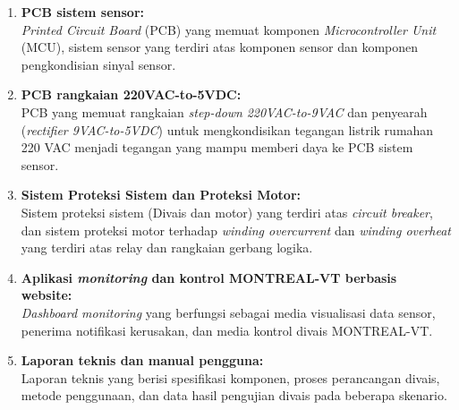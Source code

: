 \documentclass{elsinta}
\begin{document}
\begin{enumerate}
    \item   \textbf{PCB sistem sensor:} \\
            \textit{Printed Circuit Board} (PCB) yang memuat komponen
            \textit{Microcontroller Unit} (MCU), sistem sensor yang
            terdiri atas komponen sensor dan komponen pengkondisian sinyal
            sensor.
    \item   \textbf{PCB rangkaian 220VAC-to-5VDC:} \\ 
            PCB yang memuat rangkaian \textit{step-down} \textit{220VAC-to-9VAC} dan penyearah
            (\textit{rectifier 9VAC-to-5VDC}) untuk mengkondisikan
            tegangan listrik rumahan 220 VAC menjadi tegangan yang mampu
            memberi daya ke PCB sistem sensor.
    \item   \textbf{Sistem Proteksi Sistem dan Proteksi Motor:}\\
            Sistem proteksi sistem (Divais dan motor) yang terdiri atas
            \textit{circuit breaker}, dan sistem proteksi motor terhadap
            \textit{winding overcurrent} dan \textit{winding overheat} yang terdiri
            atas relay dan rangkaian gerbang logika.
    \item   \textbf{Aplikasi \textit{monitoring} dan kontrol MONTREAL-VT berbasis website:}\\
            \textit{Dashboard monitoring} yang berfungsi sebagai
            media visualisasi data sensor, penerima notifikasi kerusakan, dan media
            kontrol divais MONTREAL-VT.
    \item   \textbf{Laporan teknis dan manual pengguna:} \\
            Laporan teknis yang berisi spesifikasi komponen,
            proses perancangan divais, metode penggunaan, dan
            data hasil pengujian divais pada beberapa skenario.

\end{enumerate}

\section{\ScopeConstraintsTitle}
\subsection{\ScopeTitle}
\end{document}
